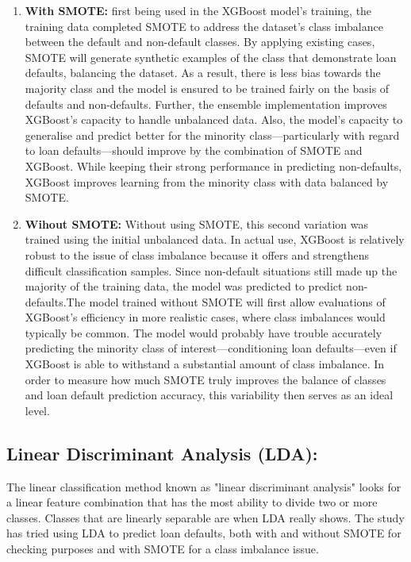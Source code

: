 \documentclass[12pt, a4paper,oneside]{book}
\numberwithin{equation}{section}
\begin{document}
\begin{enumerate}
    \item\textbf{With SMOTE:}\newline
    first being used in the XGBoost model's training, the training data completed SMOTE to address the dataset's class imbalance between the default and non-default classes. By applying existing cases, SMOTE will generate synthetic examples of the class that demonstrate loan defaults, balancing the dataset. As a result, there is less bias towards the majority class and the model is ensured to be trained fairly on the basis of defaults and non-defaults.
    Further, the ensemble implementation improves XGBoost's capacity to handle unbalanced data. Also, the model's capacity to generalise and predict better for the minority class—particularly with regard to loan defaults—should improve by the combination of SMOTE and XGBoost. While keeping their strong performance in predicting non-defaults, XGBoost improves learning from the minority class with data balanced by SMOTE. 

    \item\textbf{Wihout SMOTE:}\newline
    Without using SMOTE, this second variation was trained using the initial unbalanced data. In actual use, XGBoost is relatively robust to the issue of class imbalance because it offers and strengthens difficult classification samples. Since non-default situations still made up the majority of the training data, the model was predicted to predict non-defaults.The model trained without SMOTE will first allow evaluations of XGBoost's efficiency in more realistic cases, where class imbalances would typically be common. The model would probably have trouble accurately predicting the minority class of interest—conditioning loan defaults—even if XGBoost is able to withstand a substantial amount of class imbalance. In order to measure how much SMOTE truly improves the balance of classes and loan default prediction accuracy, this variability then serves as an ideal level.
\end{enumerate}

\subsection{Linear Discriminant Analysis (LDA):}
The linear classification method known as "linear discriminant analysis" looks for a linear feature combination that has the most ability to divide two or more classes. Classes that are linearly separable are when LDA really shows. The study has tried using LDA to predict loan defaults, both with and without SMOTE for checking purposes and with SMOTE for a class imbalance issue.
\end{document}
